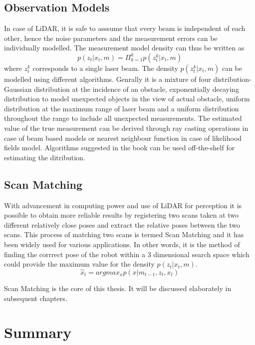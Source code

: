 \subsection{Observation Models}
In case of LiDAR, it is safe to asssume that every beam is independent of each other, hence the noise parameters and the measurement errors can be individually modelled. The measurement model density can thus be written as 
\begin{equation}
    p(z_t | x_t, m)  = \Pi_{k=1}^k  p(z_t^k | x_t, m)
\end{equation}
where  $z_t^k$ corresponds to a single laser beam. The density $p(z_t^k | x_t, m)$ can be modelled using different algorithms. Genrally it is a mixture of four distribution- Gaussian distribution at the incidence of an obstacle, exponentially decaying distribution to model unexpected objects in the view of actual obstacle, uniform distribution at the maximum range of laser beam and a uniform distribution throughout the range to include all unexpected measurements. The estimated value of the true measurement can be derived through ray casting operations in case of beam based models or nearest neighbour function in case of likelihood fields model\cite{Thrun98aprobabilistic}.  Algorithms suggested in the book \cite{Thrun98aprobabilistic} can be used off-the-shelf for estimating the ditribution.

\subsection{Scan Matching}
With advancement in computing power and use of LiDAR for perception it is possible to obtain more reliable results by registering two scans taken at two different relatively close poses and extract the relative poses between the two scans. This process of matching two scans is termed Scan Matching and it has been widely used for various applications. In other words, it is the method of finding the corrrect pose of the robot within a 3 dimensional search space which could provide the maximum value for the density $p(z_t | x_t, m)$. 
\begin{equation}
    \hat{x} _{t} = argmax_{x} p(x|m_{t-1}, z_t, x_t)
\end{equation}
\par
Scan Matching is the core of this thesis. It will be discussed elaborately in subsequent chapters.

\section{Summary}